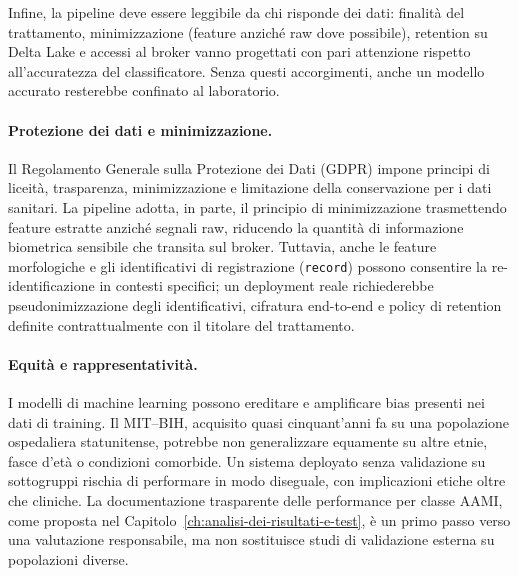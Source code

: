 Infine, la pipeline deve essere leggibile da chi risponde dei dati: finalità del trattamento, minimizzazione (feature anziché raw dove possibile), retention su Delta Lake e accessi al broker vanno progettati con pari attenzione rispetto all'accuratezza del classificatore.
Senza questi accorgimenti, anche un modello accurato resterebbe confinato al laboratorio.

\paragraph{Protezione dei dati e minimizzazione.}
Il Regolamento Generale sulla Protezione dei Dati (GDPR) impone principi di liceità, trasparenza, minimizzazione e limitazione della conservazione per i dati sanitari.
La pipeline adotta, in parte, il principio di minimizzazione trasmettendo feature estratte anziché segnali raw, riducendo la quantità di informazione biometrica sensibile che transita sul broker.
Tuttavia, anche le feature morfologiche e gli identificativi di registrazione (\texttt{record}) possono consentire la re-identificazione in contesti specifici; un deployment reale richiederebbe pseudonimizzazione degli identificativi, cifratura end-to-end e policy di retention definite contrattualmente con il titolare del trattamento.

\paragraph{Equità e rappresentatività.}
I modelli di machine learning possono ereditare e amplificare bias presenti nei dati di training.
Il MIT--BIH, acquisito quasi cinquant'anni fa su una popolazione ospedaliera statunitense, potrebbe non generalizzare equamente su altre etnie, fasce d'età o condizioni comorbide.
Un sistema deployato senza validazione su sottogruppi rischia di performare in modo diseguale, con implicazioni etiche oltre che cliniche.
La documentazione trasparente delle performance per classe AAMI, come proposta nel Capitolo~\ref{ch:analisi-dei-risultati-e-test}, è un primo passo verso una valutazione responsabile, ma non sostituisce studi di validazione esterna su popolazioni diverse.
